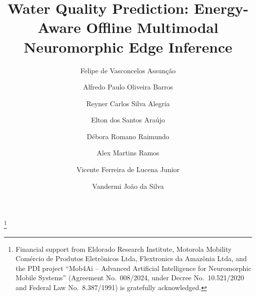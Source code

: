 \documentclass[a4paper]{ifacconf}
\begin{document}
\begin{frontmatter}

\title{Water Quality Prediction: Energy-Aware Offline Multimodal Neuromorphic Edge Inference}

\thanks[footnoteinfo]{Financial support from Eldorado Research Institute, Motorola Mobility Com\'ercio de Produtos Eletr\^onicos Ltda, Flextronics da Amaz\^onia Ltda, and the PDI project ``Mob4Ai -- Advanced Artificial Intelligence for Neuromorphic Mobile Systems'' (Agreement No.~008/2024, under Decree No.~10.521/2020 and Federal Law No.~8.387/1991) is gratefully acknowledged.}

\author[UFAM,ELD,PPGCTS]{Felipe de Vasconcelos Assun\c{c}\~ao}
\author[UFAM,PPGCTS]{Alfredo Paulo Oliveira Barros}
\author[UFAM]{Reyner Carlos Silva Alegria}
\author[IND]{Elton dos Santos Ara\'ujo}
\author[ELD]{D\'ebora Romano Raimundo}
\author[UFAM]{Alex Martins Ramos}
\author[UFAM]{Vicente Ferreira de Lucena Junior}
\author[UFAM,PPGCTS]{Vandermi Jo\~ao da Silva}

\address[UFAM]{Federal University of Amazonas (UFAM), Institute of Exact and Technological Sciences (ICET), Itacoatiara, Brazil (e-mail: \{felipe.assuncao, alfredo.barros, reyner.alegria, alexmartins, vicente, vandermi\}@ufam.edu.br).}
\address[IND]{Independent Researcher, Brazil (e-mail: elton\_araujo\_@hotmail.com).}
\address[ELD]{Eldorado Research Institute, Brazil (e-mail: debora.raimundo@eldorado.org.br, felipe.assuncao@eldorado.org.br).}
\address[PPGCTS]{Postgraduate Program in Science, Technology and Health (PPGCTS), Brazil.}


\end{frontmatter}
\end{document}
